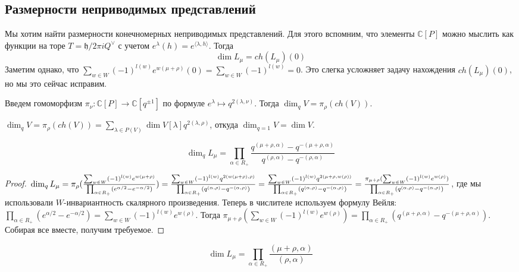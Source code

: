 \documentclass[a4article]{article}
\begin{document}
\subsection*{Размерности неприводимых представлений}
Мы хотим найти размерности конечномерных неприводимых представлений. Для этого вспомним, что элементы $\mathbb{C}[P]$ можно мыслить как функции на торе $T=\mathfrak{h}/2\pi iQ^{\vee}$ с учетом $e^{\lambda}(h)=e^{\langle \lambda, h\rangle}$. Тогда
\begin{equation}
    \dim L_{\mu}=ch(L_{\mu})(0)
\end{equation}
Заметим однако, что $\sum_{w \in W}(-1)^{l(w)}e^{w(\mu+\rho)}(0)=\sum_{w \in W}(-1)^{l(w)}=0$. Это слегка усложняет задачу нахождения $ch(L_{\mu})(0)$, но мы это сейчас исправим. 
\begin{definition}
    Введем гомоморфизм $\pi_{\nu}: \mathbb{C}[P]\rightarrow \mathbb{C}[q^{\pm1}]$ по формуле $e^\lambda \mapsto q^{2(\lambda, \nu)}$. Тогда $\dim_q V=\pi_\rho(ch(V))$.
\end{definition}
\begin{remark}
    $\dim_qV=\pi_\rho(ch(V))=\sum_{\lambda \in P(V)} \dim V[\lambda]q^{2(\lambda, \rho)}$, откуда $\dim_{q=1}V=\dim V$.
\end{remark}
\begin{theorem}
    \begin{equation}
        \dim_q L_{\mu} = \prod_{\alpha \in R_+}\frac{q^{(\mu+\rho, \alpha)}-q^{-(\mu+\rho, \alpha)}}{q^{(\rho, \alpha)}-q^{-(\rho, \alpha)}}
    \end{equation}
\end{theorem}
\begin{proof}
$\dim_q L_{\mu} = \pi_{\rho}(\frac{\sum_{w \in W}(-1)^{l(w)}e^{w(\mu+\rho)}}{\prod_{\alpha \in R_+}(e^{\alpha/2}-e^{-\alpha/2})})=\frac{\sum_{w \in W}(-1)^{l(w)}q^{2(w(\mu+\rho), \rho)}}{\prod_{\alpha \in R_+}(q^{(\alpha, \rho)}-q^{-(\alpha, \rho)})}=\\
\frac{\sum_{w \in W}(-1)^{l(w)}q^{2(\mu+\rho, w(\rho))}}{\prod_{\alpha \in R_+}(q^{(\alpha, \rho)}-q^{-(\alpha, \rho)})}=\frac{\pi_{\mu+\rho}(\sum_{w \in W}(-1)^{l(w)}e^{w(\rho)})}{\prod_{\alpha \in R_+}(q^{(\alpha, \rho)}-q^{-(\alpha, \rho)})}$, где мы использовали $W$-инвариантность скалярного произведения. Теперь в числителе используем формулу Вейля: $\prod_{\alpha \in R_+}(e^{\alpha/2}-e^{-\alpha/2})=\sum_{w\in W}(-1)^{l(w)}e^{w(\rho)}$. Тогда $\pi_{\mu+\rho}(\sum_{w \in W}(-1)^{l(w)}e^{w(\rho)}) = \prod_{\alpha \in R_+}(q^{(\mu+\rho, \alpha)}-q^{-(\mu+\rho, \alpha)})$. Собирая все вместе, получим требуемое.
\end{proof}
\begin{corollary}
    \begin{equation}
        \dim L_\mu = \prod_{\alpha \in R_+}\frac{(\mu+\rho, \alpha)}{(\rho, \alpha)}
    \end{equation}
\end{corollary}
\end{document}
